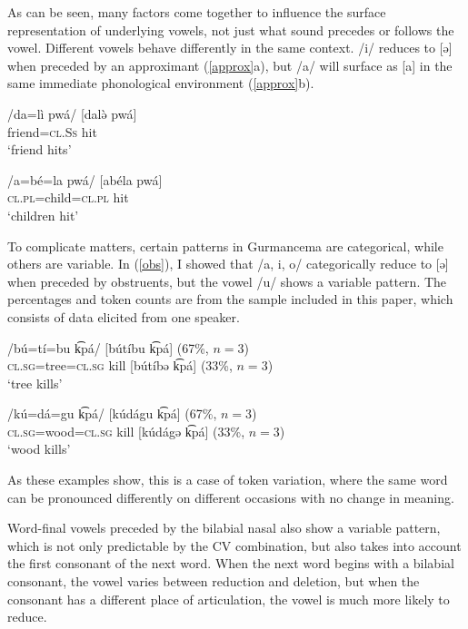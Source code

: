 \documentclass[output=paper,newtxmath,modfonts,nonflat,draftmode]{langsci/langscibook}
\begin{document}
As can be seen, many factors come together to influence the surface representation of underlying vowels, not just what sound precedes or follows the vowel. Different vowels behave differently in the same context. /i/ reduces to [ə] when preceded by an approximant (\ref{approx}a), but /a/ will surface as [a] in the same immediate phonological environment (\ref{approx}b). 

\ea \label{approx}
\ea 
\gll /da=lì pwá/ \hspace{0.8cm} [dalə̀ pwá]\\
friend=\textsc{cl.Ss} hit\\
\glt `friend hits'

\ex
\gll /a=bé=la pwá/ \hspace{0.5cm} [abéla pwá]\\
\textsc{cl.pl}=child=\textsc{cl.pl} hit\\
\glt `children hit'
\z
\z

To complicate matters, certain patterns in Gurmancema are categorical, while others are variable. In (\ref{obs}), I showed that /a, i, o/ categorically reduce to [ə] when preceded by obstruents, but the vowel /u/ shows a variable pattern. The percentages and token counts are from the sample included in this paper, which consists of data elicited from one speaker. 

\ea \label{u}
\ea
\gll /bú=tí=bu k͡pá/  \hspace{0.6cm} [bútíbu k͡pá] (67\%, $n=3$) \\
 \textsc{cl.sg}=tree=\textsc{cl.sg} kill \hspace{0.5cm} [bútíbə k͡pá] (33\%, $n=3$)\\ 
\glt `tree kills'

\ex
\gll /kú=dá=gu k͡pá/  \hspace{0.5cm} [kúdágu k͡pá] (67\%, $n=3$) \\
 \textsc{cl.sg}=wood=\textsc{cl.sg} kill \hspace{0.5cm} [kúdágə k͡pá] (33\%, $n=3$)\\ 
\glt `wood kills'
\z
\z

As these examples show, this is a case of token variation, where the same word can be pronounced differently on different occasions with no change in meaning. 

Word-final vowels preceded by the bilabial nasal also show a variable pattern, which is not only predictable by the CV combination, but also takes into account the first consonant of the next word. When the next word begins with a bilabial consonant, the vowel varies between reduction and deletion, but when the consonant has a different place of articulation, the vowel is much more likely to reduce. 
\end{document}
